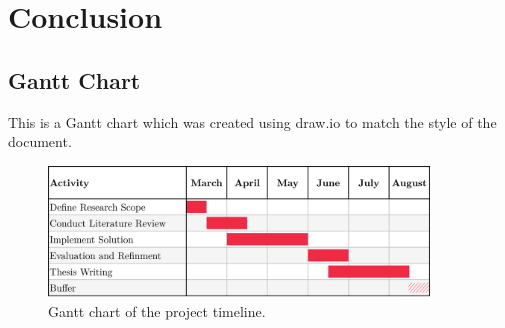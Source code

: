 \chapter{Conclusion}
\label{chap:conclusion}

\section{Gantt Chart}

This is a Gantt chart which was created using draw.io to match the style of the document.

\begin{figure}[htbp]
    \centering
    \includegraphics[width=0.9\textwidth]{figures/gantt-chart.png}
    \caption{Gantt chart of the project timeline.}
    \label{fig:gantt-chart}
\end{figure}
